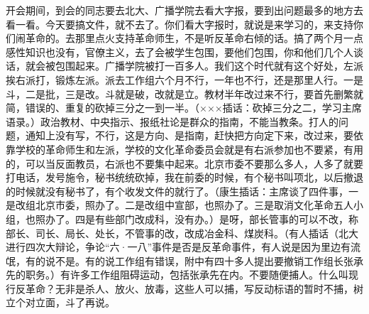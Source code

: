 开会期间，到会的同志要去北大、广播学院去看大字报，要到出问题最多的地方去看一看。今天要搞文件，就不去了。你们看大字报时，就说是来学习的，来支持你们闹革命的。去那里点火支持革命师生，不是听反革命右倾的话。搞了两个月一点感性知识也没有，官僚主义，去了会被学生包围，要他们包围，你和他们几个人谈话，就会被包围起来。广播学院被打一百多人。我们这个时代就有这个好处，左派挨右派打，锻炼左派。派去工作组六个月不行，一年也不行，还是那里人行。一是斗，二是批，三是改。斗就是破，改就是立。教材半年改过来不行，要首先删繁就简，错误的、重复的砍掉三分之一到一半。（×××插话：砍掉三分之二，学习主席语录。）政治教材、中央指示、报纸社论是群众的指南，不能当教条。打人的问题，通知上没有写，不行，这是方向、是指南，赶快把方向定下来，改过来，要依靠学校的革命师生和左派，学校的文化革命委员会就是有右派参加也不要紧，有用的，可以当反面教员，右派也不要集中起来。北京市委不要那么多人，人多了就要打电话，发号施令，秘书统统砍掉，我在前委的时候，有个秘书叫项北，以后撤退的时候就没有秘书了，有个收发文件的就行了。（康生插话：主席谈了四件事，一是改组北京市委，照办了。二是改组中宣部，也照办了。三是取消文化革命五人小组，也照办了。四是有些部门改成科，没有办。）是呀，部长管事的可以不改，称部长、司长、局长、处长，不管事的改，改成冶金科、煤炭科。（有人插话（北大进行四次大辩论，争论“六·一八”事件是否是反革命事件，有人说是因为里边有流氓，有的说不是。有的说工作组有错误，附中有四十多人提出要撤销工作组长张承先的职务。）有许多工作组阻碍运动，包括张承先在内。不要随便捕人。什么叫现行反革命？无非是杀人、放火、放毒，这些人可以捕，写反动标语的暂时不捕，树立个对立面，斗了再说。


